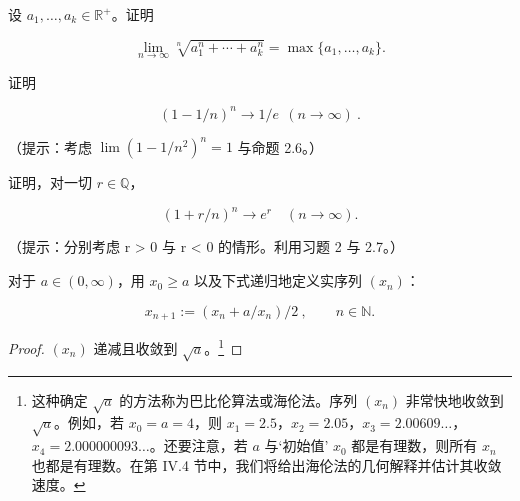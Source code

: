 \exerciseshead

\begin{exercises}
\item

设  $ a_1, \ldots, a_k \in \mathbb{R}^+ $。证明

\[
\lim_{n\to\infty}\sqrt[n]{a_{1}^{n}+\cdots+a_{k}^{n}}=\max\{a_{1},\ldots,a_{k}\}.
\]
\item

证明

\[
(1-1/n)^{n}\to1/e\ \ (n\to\infty)~.
\]

（提示：考虑  $ \lim(1 - 1/n^2)^n = 1 $ 与命题 2.6。）

\item

证明，对一切  $ r \in \mathbb{Q} $，

\[
(1+r/n)^{n}\to e^{r}\quad(n\to\infty).
\]

（提示：分别考虑 r > 0 与 r < 0 的情形。利用习题 2 与 2.7。）

\item

对于  $ a \in (0, \infty) $，用  $ x_0 \geq a $ 以及下式递归地定义实序列  $ (x_n) $：

\[
x_{n+1}:=(x_{n}+a/x_{n})/2~,\qquad n\in\mathbb{N}.
\]
\end{exercises}

\begin{proof}

$(x_{n})$ 递减且收敛到 $\sqrt{a}$。\footnote{这种确定 $\sqrt{a}$ 的方法称为巴比伦算法或海伦法。序列 $(x_{n})$ 非常快地收敛到 $\sqrt{a}$。例如，若 $x_{0} = a = 4$，则 $x_{1} = 2.5$，$x_{2} = 2.05$，$x_{3} = 2.00609\ldots$，$x_{4} = 2.000000093\ldots$。还要注意，若 $a$ 与‘初始值’ $x_{0}$ 都是有理数，则所有 $x_{n}$ 也都是有理数。在第 IV.4 节中，我们将给出海伦法的几何解释并估计其收敛速度。}

\end{proof}

